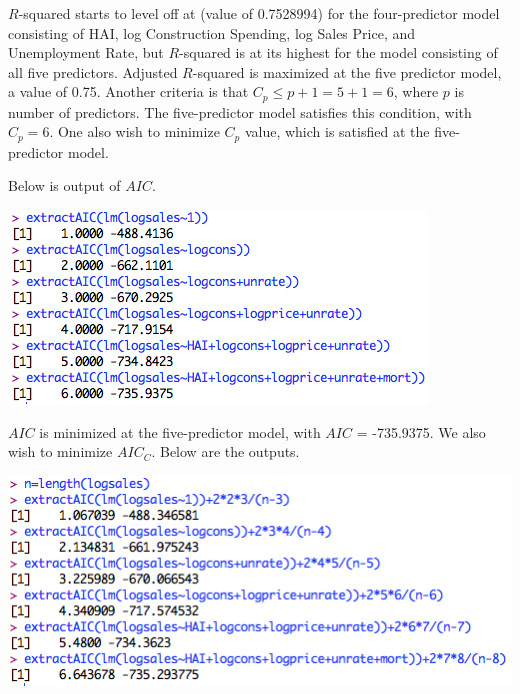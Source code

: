 \documentclass[a4 paper, 11 pt]{article}
\begin{document}
$R$-squared starts to level off at (value of 0.7528994) for the four-predictor model consisting of HAI, log Construction Spending, log Sales Price, and Unemployment Rate, but $R$-squared is at its highest for the model consisting of all five predictors.
Adjusted $R$-squared is maximized at the five predictor model, a value of 0.75. Another criteria is that $C_p \le p+1 = 5+1 = 6$, where $p$ is number of predictors. The five-predictor model satisfies this condition, with $C_p = 6$. One also wish to minimize $C_p$ value, which is satisfied at the five-predictor model.

Below is output of $AIC$.
\begin{center}
\includegraphics[scale=0.5]{AIC}
\end{center}
$AIC$ is minimized at the five-predictor model, with $AIC$ = -735.9375. We also wish to minimize $AIC_C$. Below are the outputs.
\begin{center}
\includegraphics[scale=0.5]{AICC}
\end{center}
\end{document}
